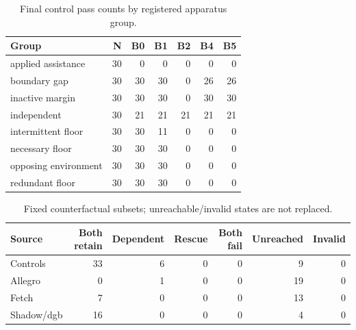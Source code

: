 \begin{table}[h]\centering\small\caption{Final control pass counts by registered apparatus group.}\label{tab:mechanisms}\begin{tabular}{lrrrrrr}\toprule
Group & N & B0 & B1 & B2 & B4 & B5\\\midrule
applied assistance & 30 & 0 & 0 & 0 & 0 & 0\\
boundary gap & 30 & 30 & 30 & 0 & 26 & 26\\
inactive margin & 30 & 30 & 30 & 0 & 30 & 30\\
independent & 30 & 21 & 21 & 21 & 21 & 21\\
intermittent floor & 30 & 30 & 11 & 0 & 0 & 0\\
necessary floor & 30 & 30 & 30 & 0 & 0 & 0\\
opposing environment & 30 & 30 & 30 & 0 & 0 & 0\\
redundant floor & 30 & 30 & 30 & 0 & 0 & 0\\
\bottomrule\end{tabular}\end{table}
\begin{table}[h]\centering\small\caption{Fixed counterfactual subsets; unreachable/invalid states are not replaced.}\label{tab:cf}\begin{tabular}{lrrrrrr}\toprule
Source & Both retain & Dependent & Rescue & Both fail & Unreached & Invalid\\\midrule
Controls & 33 & 6 & 0 & 0 & 9 & 0\\
Allegro & 0 & 1 & 0 & 0 & 19 & 0\\
Fetch & 7 & 0 & 0 & 0 & 13 & 0\\
Shadow/dgb & 16 & 0 & 0 & 0 & 4 & 0\\
\bottomrule\end{tabular}\end{table}
